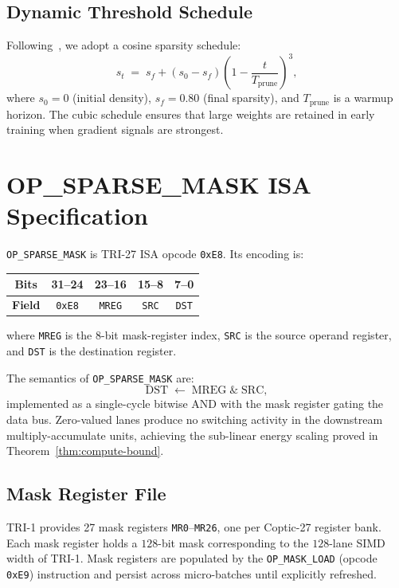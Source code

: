 \subsection{Dynamic Threshold Schedule}
\label{subsec:threshold}

Following~\cite{evci2020rigging}, we adopt a cosine sparsity schedule:
\[
  s_t \;=\; s_f + (s_0 - s_f)\!\left(1 - \frac{t}{T_{\mathrm{prune}}}\right)^3,
\]
where $s_0 = 0$ (initial density), $s_f = 0.80$ (final sparsity), and
$T_{\mathrm{prune}}$ is a warmup horizon.  The cubic schedule ensures that
large weights are retained in early training when gradient signals are strongest.


\section{OP\_SPARSE\_MASK ISA Specification}
\label{sec:op-sparse-mask}

\begin{definition}
\label{def:op-sparse-mask}
\texttt{OP\_SPARSE\_MASK} is TRI-27 ISA opcode \texttt{0xE8}.  Its encoding is:
\begin{center}
\begin{tabular}{|c|c|c|c|c|}
\hline
\textbf{Bits} & 31--24 & 23--16 & 15--8 & 7--0 \\
\hline
\textbf{Field} & \texttt{0xE8} & \texttt{MREG} & \texttt{SRC} & \texttt{DST} \\
\hline
\end{tabular}
\end{center}
where \texttt{MREG} is the 8-bit mask-register index, \texttt{SRC} is the
source operand register, and \texttt{DST} is the destination register.
\end{definition}

The semantics of \texttt{OP\_SPARSE\_MASK} are:
\[
  \mathrm{DST} \;\leftarrow\; \mathrm{MREG} \;\mathbin{\&}\; \mathrm{SRC},
\]
implemented as a single-cycle bitwise AND with the mask register gating the
data bus.  Zero-valued lanes produce no switching activity in the downstream
multiply-accumulate units, achieving the sub-linear energy scaling proved in
Theorem~\ref{thm:compute-bound}.

\subsection{Mask Register File}
\label{subsec:mask-reg}

TRI-1 provides 27 mask registers \texttt{MR0}--\texttt{MR26}, one per Coptic-27
register bank.  Each mask register holds a $128$-bit mask corresponding to the
$128$-lane SIMD width of TRI-1.  Mask registers are populated by the
\texttt{OP\_MASK\_LOAD} (opcode \texttt{0xE9}) instruction and persist across
micro-batches until explicitly refreshed.

